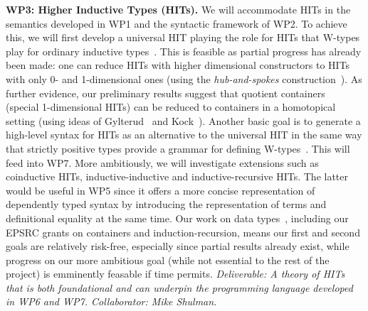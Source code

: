 \documentclass[a4paper,11pt]{article}
\begin{document}


{\bf WP3: Higher Inductive Types (HITs).}  We will accommodate HITs in
the semantics developed in WP1 and the syntactic framework of WP2. To
achieve this, we will first develop a universal HIT playing the role
for HITs that W-types play for ordinary inductive
types~\cite{alti:cont-tcs}. This is feasible as partial progress has
already been made: one can reduce HITs with higher dimensional
constructors to HITs with only 0- and 1-dimensional ones (using the
\emph{hub-and-spokes} construction~\cite{hott-book}). As further
evidence, our preliminary results suggest that quotient
containers~\cite{alti:mpc04} (special 1-dimensional HITs) can be
reduced to containers in a homotopical setting (using ideas of
Gylterud~\cite{gylterud:thesis} and Kock~\cite{kock:groupoids}).
Another basic goal is to generate a high-level syntax for HITs as an
alternative to the universal HIT in the same way that strictly
positive types provide a grammar for defining
W-types~\cite{alti:cont-tcs}.  This will feed into WP7.  More
ambitiously, we will investigate extensions such as coinductive HITs,
inductive-inductive and inductive-recursive HITs. The latter would be
useful in WP5 since it offers a more concise representation of
dependently typed syntax by introducing the representation of terms
and definitional equality at the same time.  Our work on data
types~\cite{alti:cont-tcs,
  altenkirchGhaniHancockMcBrideMorris:indexedContainers,
  alti:catind2,ghani:fibredIR,GambinoN:polfpm,awodeyGamSoja:indTypesInHTT},
including our EPSRC grants on containers and induction-recursion,
means our first and second goals are relatively risk-free, especially
since partial results already exist,
while progress on our more ambitious goal (while not essential to the rest
of the project) is emminently feasable if time permits. {\em Deliverable: A
  theory of HITs that is both foundational and can underpin the
  programming language developed in WP6 and WP7. 
Collaborator: Mike Shulman. 
}
\end{document}
